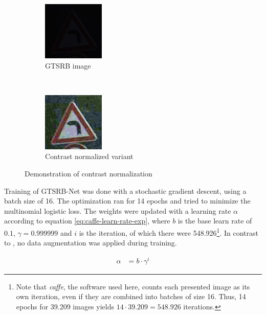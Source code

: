\documentclass[11pt, a4paper]{article}
\begin{document}
\begin{figure}[htb]
    \centering
    \begin{subfigure}[b]{0.45\textwidth}
    		\centering
        \includegraphics{gtsrb/problems/class19_00004_00029.jpg}
        \caption{GTSRB image}
        \label{fig:contrast-normalization-before}
    \end{subfigure}
    ~ %
    \begin{subfigure}[b]{0.45\textwidth}
    		\centering
        \includegraphics{gtsrb/problems/class19_00004_00029_normalized_contrast.jpg}
        \caption{Contrast normalized variant}
        \label{fig:contrast-normalization-after}
    \end{subfigure}
    \caption{Demonstration of contrast normalization}
    \label{fig:contrast-normalization}
\end{figure}

Training of GTSRB-Net was done with a stochastic gradient descent, using a batch size of 16. The optimization ran for 14 epochs and tried to minimize the multinomial logistic loss. The weights were updated with a learning rate $\alpha$ according to equation \eqref{eq:caffe-learn-rate-exp}, where $b$ is the base learn rate of $0.1$, $\gamma = 0.999999$ and $i$ is the iteration, of which there were 548.926\footnote{Note that \emph{caffe}, the software used here, counts each presented image as its own iteration, even if they are combined into batches of size 16. Thus, 14 epochs for 39.209 images yields $14 \cdot 39.209 = 548.926$ iterations.}. In contrast to \cite{multi-column-neural-network-gtsrb}, no data augmentation was applied during training.

\begin{align}
	\alpha &= b \cdot \gamma^i \label{eq:caffe-learn-rate-exp}
\end{align}
\end{document}
